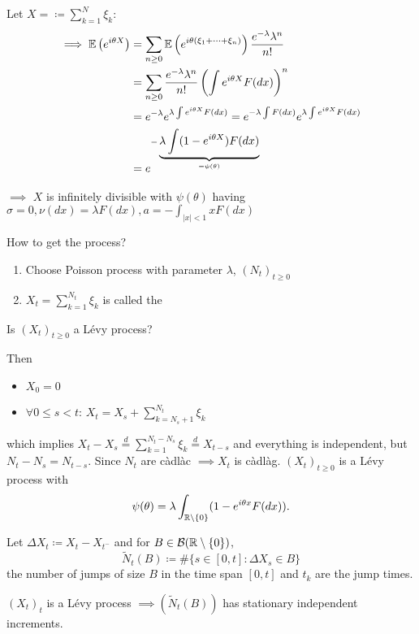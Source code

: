 Let $X=\coloneqq \sum_{k=1}^N\xi_k$:
\begin{align*}
    \implies \mathbb{E}\left(e^{i\theta X}\right)&=\sum_{n\geq 0}\mathbb{E}\left(e^{i\theta(\xi_1+\dots+\xi_n)}\right)\frac{e^{-\lambda} \lambda^n}{n!}\\
    &=\sum_{n\geq 0}\frac{e^{-\lambda} \lambda^n}{n!}\left(\int e^{i\theta X}F(dx)\right)^n \\
    &=e^{-\lambda}e^{\lambda\int e^{i\theta X}F(dx)}=e^{-\lambda \int F(dx)}e^{\lambda\int e^{i\theta X}F(dx)}\\
    &=e^{-\underbrace{\lambda\int (1-e^{i\theta X})F(dx)}_{=\psi(\theta)}}
\end{align*}

$\implies$ $X$ is infinitely divisible with $\psi(\theta)$ having $\sigma=0,\nu(dx)=\lambda F(dx),a=-\int_{|x|<1} x F(dx)$

How to get the process?
\begin{enumerate}
    \item Choose Poisson process with parameter $\lambda$, $(N_t)_{t\geq 0}$
    \item $X_t=\sum_{k=1}^{N_t}\xi_k$ is called the 
\end{enumerate}

Is $(X_t)_{t\geq 0}$ a Lévy process?

Then \begin{itemize}
    \item $X_0=0$
    \item $\forall 0\leq s<t$: $X_t=X_s+\sum_{k=N_s+1}^{N_t}\xi_k$ 
\end{itemize}
which implies $X_t-X_s\stackrel{d}{=}\sum_{k=1}^{N_t-N_s}\xi_k\stackrel{d}{=}X_{t-s}$ and everything is independent, but 
$N_t-N_s=N_{t-s}$.
Since $N_t$ are càdlàc $\implies X_t$ is càdlàg. $(X_t)_{t\geq 0}$ is a Lévy process with 
\[\psi(\theta)=\lambda \int_{\mathbb{R}\setminus\{0\}}(1-e^{i\theta x}F(dx)).\]

Let $\Delta X_t\coloneqq X_t-X_{t^-}$ and for $B\in\mathcal{B}(\mathbb{R}\setminus\{0\})$,
\[\tilde{N}_t(B)\coloneqq \#\{s\in[0,t]:\Delta X_{s}\in B\}\]
the number of jumps of size $B$ in the time span $[0,t]$ and $t_k$ are the jump times.

$(X_t)_t$ is a Lévy process $\implies (\tilde{N}_t(B))$ has stationary independent increments.

